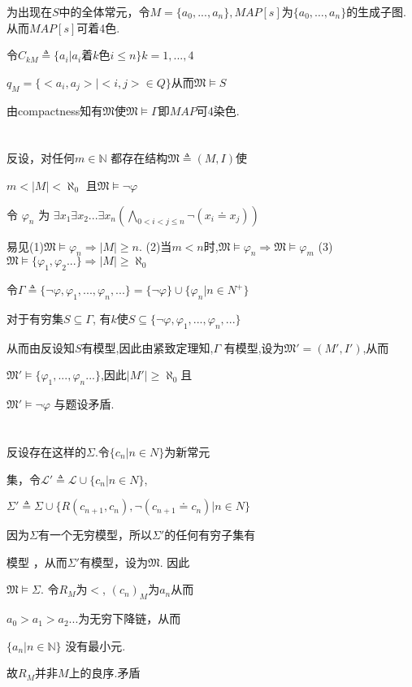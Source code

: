 \documentclass{article}
\begin{document}
为出现在$S$中的全体常元，令$M=\{a_0,...,a_n\},MAP[s]$为$\{a_0,\dots,a_n\}$的生成子图. 	从而$MAP[s]$可着4色. 

令$C_{kM} \triangleq \{a_i|a_i$着$k$色$i\leq n\}k=1,...,4$

$q_M =\{<a_i,a_j>|<i,j>\in Q\}$从而$\mathfrak{M} \vDash S$

由compactness知有$\mathfrak{M}$使$\mathfrak{M}\vDash \Gamma $即$MAP$可4染色.

\section{}
反设，对任何$m\in \mathbb{N}$ 都存在结构$\mathfrak{M} \triangleq (M,I)$使

$m <|M| < \aleph_0$ 且$\mathfrak{M}\vDash \neg  \varphi $

令 $\varphi_n$ 为 $\exists x_1 \exists x_2 ... \exists x_n (\bigwedge_{0<i<j\leq n}\neg (x_i \doteq x_j))$

易见(1)$ \mathfrak{M}\vDash \varphi_n \Rightarrow |M|\geq n$. (2)当$m<n$时,$\mathfrak{M}\vDash \varphi_n \Rightarrow \mathfrak{M}\vDash \varphi_m$ 
(3)$\mathfrak{M}\vDash \{\varphi_1,\varphi_2...\} \Rightarrow |M|\geq \aleph_0$

令$\Gamma \triangleq \{ \neg  \varphi, \varphi_1, ..., \varphi_n ,...\} = \{ \neg \varphi \}\cup \{\varphi_n |n \in N^+\}$

对于有穷集$S \subseteq \Gamma$, 有$k$使$S\subseteq \{ \neg  \varphi, \varphi_1, ..., \varphi_n ,...\} $

从而由反设知$S$有模型,因此由紧致定理知,$\Gamma$ 有模型,设为$\mathfrak{M'} = (M',I')$,从而

$\mathfrak{M'}\vDash \{\varphi_1, ..., \varphi_n...\}$,因此$|M'|\geq \aleph_0$且

$\mathfrak{M'} \vDash \neg \varphi$ 与题设矛盾.


\section{}

反设存在这样的$\Sigma$.令$\{c_n|n \in N\}$为新常元

集，令$\mathscr{L'}\triangleq \mathscr{L} \cup \{c_n | n \in N\}$,

$\Sigma' \triangleq \Sigma \cup \{R (c_{n+1},c_n),\neg (c_{n+1}\doteq c_n)| n\in N\}$


因为$\Sigma$有一个无穷模型，所以$\Sigma'$的任何有穷子集有

模型 ，从而$\Sigma'$有模型，设为$\mathfrak{M}$. 因此

$\mathfrak{M} \vDash \Sigma$. 令$R_M$为$<$, $(c_n)_M$为$a_n$从而

$a_0>a_1>a_2...$为无穷下降链，从而

$\{a_n | n \in \mathbb{N}\}$ 没有最小元.

故$R_M$并非$M$上的良序.矛盾
\end{document}
